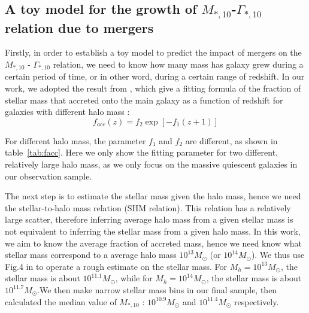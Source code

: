\documentclass[fleqn,usenatbib]{mnras}
\begin{document}
\subsection{A toy model for the growth of $M_{*,10}$-$\Gamma_{*,10}$ relation due to mergers}
\label{sec:toy}
Firstly, in order to establish a toy model to predict the impact of mergers on the $M_{*,10}$ - $\Gamma_{*,10}$ relation, we need to know how many mass has galaxy grew during a certain period of time, or in other word, during a certain range of redshift. In our work, we adopted the result from \cite{2018moster}, which give a fitting formula of the fraction of stellar mass that accreted onto the main galaxy as a function of redshift for galaxies with different halo mass : 
\begin{equation}
    \label{eq:facc}
    f_{acc}(z) = f_2\exp \left[-f_1(z+1)\right]
\end{equation}
\par For different halo mass, the parameter $f_1$ and $f_2$ are different, as shown in table~\ref{tab:facc}. Here we only show the fitting parameter for two different, relatively large halo mass, as we only focus on the massive quiescent galaxies in our observation sample.
\par The next step is to estimate the stellar mass given the halo mass, hence we need the stellar-to-halo mass relation (SHM relation). This relation has a relatively large scatter, therefore inferring average halo mass from a given stellar mass is not equivalent to inferring the stellar mass from a given halo mass. In this work, we aim to know the average fraction of accreted mass, hence we need know what stellar mass correspond to a average halo mass $10^{13}M_\odot$ (or $10^{14}M_\odot$).  We thus use Fig.4 in \cite{2020moster} to operate a rough estimate on the stellar mass. For $M_h = 10^{13}M_\odot$, the stellar mass is about $10^{11.1}M_\odot$, while for $M_h = 10^{14}M_\odot$, the stellar mass is about $10^{11.7}M_\odot$.We then make narrow stellar mass bins in our final sample, then calculated the median value of $M_{*,10}$ : $10^{10.9}M_\odot$ and $10^{11.4}M_\odot$ respectively.
\end{document}
